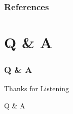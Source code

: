 \documentclass[
	11pt, %
	aspectratio=169, %
]{beamer}
\begin{document}
\begin{frame}
	\frametitle{References}

	\printbibliography
\end{frame}


\section{Q \& A}

\begin{frame}
    \frametitle{Q \& A}
	\begin{center}
		{\Huge Thanks for Listening}
		
		\bigskip\bigskip %
		
		{\LARGE Q \& A}

	\end{center}
\end{frame}

\end{document}
